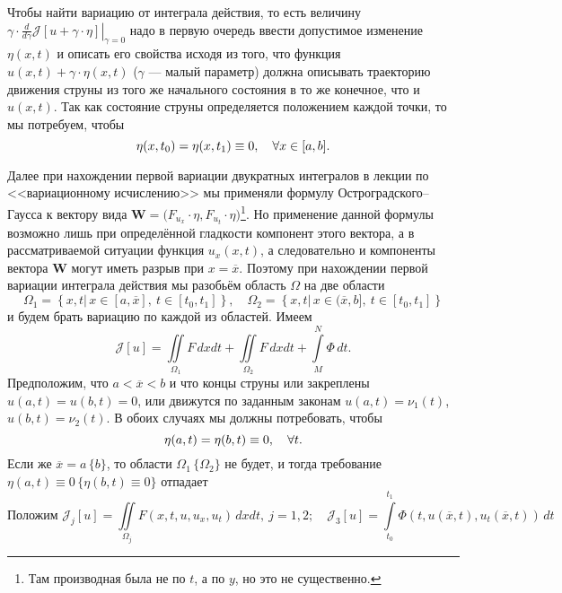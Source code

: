 \documentclass[12pt,a4paper,openany,fleqn]{book}
\newcommand{\J}{\ensuremath{\mathcal{J}}}
\newcommand{\der}[2]{\ensuremath{\frac{d#1}{d#2}}}
\theoremstyle{definition}
\begin{document}
\noindent Чтобы найти вариацию от интеграла действия, то есть величину $\displaystyle\gamma\cdot\left.\der{}{\gamma}\J[u+\gamma\cdot\eta]\right|_{\gamma=0}$ надо в первую очередь ввести допустимое изменение $\eta(x,t)$ и описать его свойства исходя из того, что функция $u(x,t)+\gamma\cdot\eta(x,t)$ ($\gamma$ --- малый параметр) должна описывать траекторию движения струны из того же начального состояния в то же конечное, что и $u(x,t)$. Так как состояние струны определяется положением каждой точки, то мы потребуем, чтобы  
\begin{equation*}
	\hfill \eta(x,t_0)=\eta(x,t_1)\equiv0,\quad\forall x\in[a,b].\hfill
\end{equation*}

Далее при нахождении первой вариации двукратных интегралов в лекции по <<вариационному исчислению>> мы применяли формулу Остроградского--Гаусса к вектору вида $\bm{W}=\big(F_{u_x}\cdot\eta,F_{u_t}\cdot\eta\big)$\footnote{Там производная была не по $t$, а по $y$, но это не существенно.}. Но применение данной формулы возможно лишь при определённой гладкости компонент этого вектора, а в рассматриваемой ситуации функция $u_x(x,t)$, а следовательно и компоненты вектора $\bm{W}$ могут иметь разрыв при $x=\overline{x}$. Поэтому при нахождении первой вариации интеграла действия мы разобьём область $\Omega$ на две области
\begin{equation*}
	\Omega_{1}=\left\{x,t|\,x\in[a,\overline{x}],\ t\in[t_0,t_1]\right\},\quad	\Omega_{2}=\left\{x,t|\,x\in(\overline{x},b],\ t\in[t_0,t_1]\right\}
\end{equation*} 
и будем брать вариацию по каждой из областей. Имеем 
\begin{equation*}
	\J[u]=\iint\limits_{\Omega_1}F\,dxdt+\iint\limits_{\Omega_2}F\,dxdt+\int\limits_{M}^{N}\Phi\,dt.
\end{equation*}
Предположим, что $a<\overline{x}<b$ и что концы струны или закреплены $u(a,t)=u(b,t)=0$, или движутся по заданным законам $u(a,t)=\nu_1(t)$, $u(b,t)=\nu_2(t)$. В обоих случаях мы должны потребовать, чтобы 
\begin{equation*}
	\hfill\eta(a,t)=\eta(b,t)\equiv0,\quad\forall t.\hfill
\end{equation*}
Если же $\overline{x}=a\,\{b\}$, то области $\Omega_{1}\,\{\Omega_{2}\}$ не будет, и тогда требование $\eta(a,t)\equiv0\,\{\eta(b,t)\equiv0\}$ отпадает
\begin{equation*}
	\text{Положим  }\J_j[u]=\iint\limits_{\Omega_j}F(x,t,u,u_x,u_t)\,dxdt,\ j=1,2;\quad\J_3[u]=\int\limits_{t_0}^{t_1}\Phi(t,u(\overline{x},t),u_t(\overline{x},t))\,dt 
\end{equation*}
\end{document}
